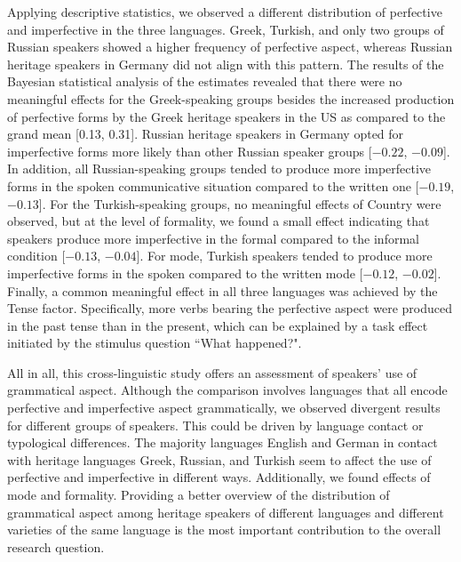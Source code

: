 \documentclass[output=paper,colorlinks,citecolor=brown]{langscibook}
\begin{document}
Applying descriptive statistics, we observed a different distribution of perfective and imperfective in the three languages. Greek, Turkish, and only two groups of Russian speakers showed a higher frequency of perfective aspect, whereas Russian heritage speakers in Germany did not align with this pattern. The results of the Bayesian statistical analysis of the estimates revealed that there were no meaningful effects for the Greek-speaking groups besides the increased production of perfective forms by the Greek heritage speakers in the US as compared to the grand mean [0.13, 0.31].
Russian heritage speakers in Germany opted for imperfective forms more likely than other Russian speaker groups [$-0.22$, $-0.09$]. In addition, all Russian-speaking groups tended to produce more imperfective forms in the spoken communicative situation compared to the written one [$-0.19$, $-0.13$]. For the Turkish-speaking groups, no meaningful effects of Country were observed, but at the level of formality, we found a small effect indicating that speakers produce
more imperfective in the formal compared to the informal condition [$-0.13$, $-0.04$]. For mode, Turkish speakers tended to produce more imperfective forms in the spoken compared to the written mode [$-0.12$, $-0.02$]. Finally, a common meaningful effect in all three languages was achieved by the Tense factor. Specifically, more verbs bearing the perfective aspect were produced in the past tense than in the present, which can be explained by a task effect initiated by the stimulus question ``What happened?". 

All in all, this cross-linguistic study offers an assessment of speakers' use of grammatical aspect. Although the comparison involves languages that all encode perfective and imperfective aspect grammatically, we observed divergent results for different groups of speakers. This could be driven by language contact or typological differences. The majority languages English and German in contact with heritage languages Greek, Russian, and Turkish seem to affect the use of perfective and imperfective in different ways. Additionally, we found effects of mode and formality. Providing a better overview of the distribution of grammatical aspect among heritage speakers of different languages and different varieties of the same language is the most important contribution to the overall research question.
\end{document}
